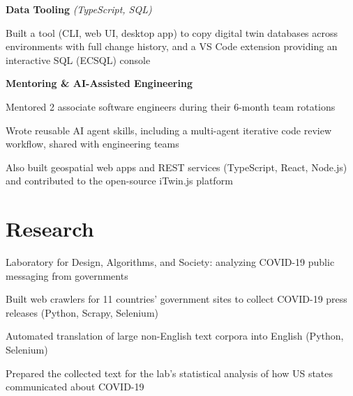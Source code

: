\documentclass[]{deedy-resume-openfont}
\begin{document}
\begin{minipage}[t]{0.66\textwidth}
{\bf Data Tooling} \textit{(TypeScript, SQL)}
\begin{tightemize}
\item Built a tool (CLI, web UI, desktop app) to copy digital twin databases across environments with full change history, and a VS Code extension providing an interactive SQL (ECSQL) console
\end{tightemize}
\vspace{4pt}

{\bf Mentoring \& AI-Assisted Engineering}
\begin{tightemize}
\item Mentored 2 associate software engineers during their 6-month team rotations
\item Wrote reusable AI agent skills, including a multi-agent iterative code review workflow, shared with engineering teams
\end{tightemize}
\vspace{4pt}
Also built geospatial web apps and REST services (TypeScript, React, Node.js) and contributed to the open-source iTwin.js platform
\sectionsep


\section{Research}

Laboratory for Design, Algorithms, and Society: analyzing COVID-19 public messaging from governments
\vspace{\topsep}
\begin{tightemize}
\item Built web crawlers for 11 countries' government sites to collect COVID-19 press releases (Python, Scrapy, Selenium)
\item Automated translation of large non-English text corpora into English (Python, Selenium)
\item Prepared the collected text for the lab's statistical analysis of how US states communicated about COVID-19
\end{tightemize}
\sectionsep

\end{minipage}

\newpage

%
%
\end{document}
